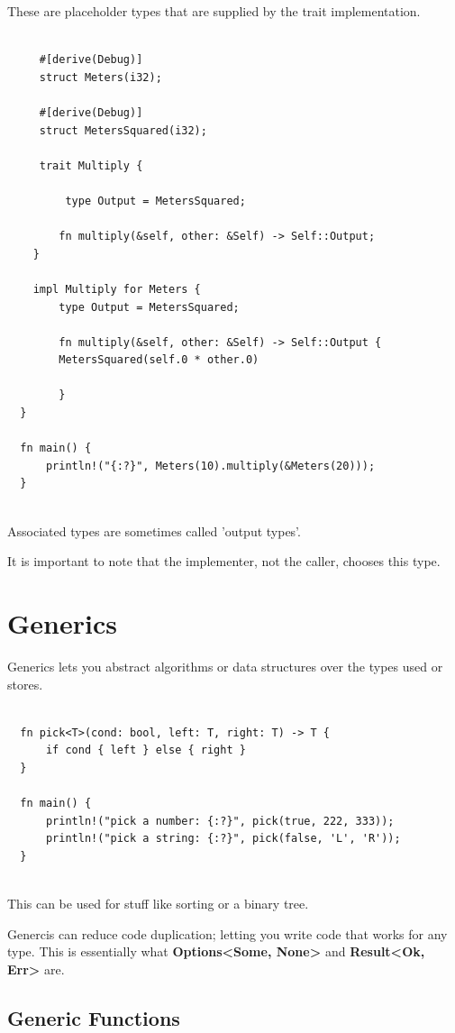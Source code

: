 \documentclass[11pt]{article}
\begin{document}
These are placeholder types that are supplied by the trait implementation.

\begin{verbatim}

     #[derive(Debug)]
     struct Meters(i32);

     #[derive(Debug)]
     struct MetersSquared(i32);

     trait Multiply {

         type Output = MetersSquared;

    	fn multiply(&self, other: &Self) -> Self::Output;
    }

    impl Multiply for Meters {
        type Output = MetersSquared;

        fn multiply(&self, other: &Self) -> Self::Output {
    	MetersSquared(self.0 * other.0)
    	    
        }
  }

  fn main() {
      println!("{:?}", Meters(10).multiply(&Meters(20)));
  }


\end{verbatim}

Associated types are sometimes called 'output types'.

It is important to note that the implementer, not the caller, chooses this type.
\section{Generics}
\label{sec:org5c4677a}

Generics lets you abstract algorithms or data structures over the types used or stores.

\begin{verbatim}

  fn pick<T>(cond: bool, left: T, right: T) -> T {
      if cond { left } else { right }
  }

  fn main() {
      println!("pick a number: {:?}", pick(true, 222, 333));
      println!("pick a string: {:?}", pick(false, 'L', 'R'));
  }


\end{verbatim}

This can be used for stuff like sorting or a binary tree.

Genercis can reduce code duplication; letting you write code that works for any type.
This is essentially what \textbf{Options<Some, None>} and \textbf{Result<Ok, Err>} are.
\subsection{Generic Functions}
\label{sec:orgf2abfc4}
\end{document}
